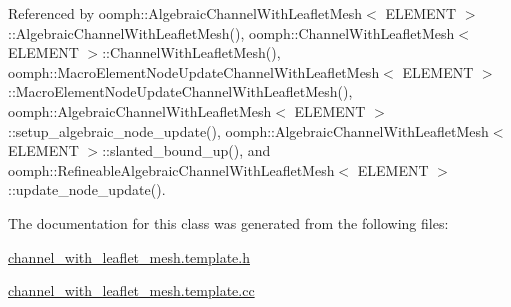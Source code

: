 Referenced by oomph\+::\+Algebraic\+Channel\+With\+Leaflet\+Mesh$<$ E\+L\+E\+M\+E\+N\+T $>$\+::\+Algebraic\+Channel\+With\+Leaflet\+Mesh(), oomph\+::\+Channel\+With\+Leaflet\+Mesh$<$ E\+L\+E\+M\+E\+N\+T $>$\+::\+Channel\+With\+Leaflet\+Mesh(), oomph\+::\+Macro\+Element\+Node\+Update\+Channel\+With\+Leaflet\+Mesh$<$ E\+L\+E\+M\+E\+N\+T $>$\+::\+Macro\+Element\+Node\+Update\+Channel\+With\+Leaflet\+Mesh(), oomph\+::\+Algebraic\+Channel\+With\+Leaflet\+Mesh$<$ E\+L\+E\+M\+E\+N\+T $>$\+::setup\+\_\+algebraic\+\_\+node\+\_\+update(), oomph\+::\+Algebraic\+Channel\+With\+Leaflet\+Mesh$<$ E\+L\+E\+M\+E\+N\+T $>$\+::slanted\+\_\+bound\+\_\+up(), and oomph\+::\+Refineable\+Algebraic\+Channel\+With\+Leaflet\+Mesh$<$ E\+L\+E\+M\+E\+N\+T $>$\+::update\+\_\+node\+\_\+update().



The documentation for this class was generated from the following files\+:\begin{DoxyCompactItemize}
\item 
\hyperlink{channel__with__leaflet__mesh_8template_8h}{channel\+\_\+with\+\_\+leaflet\+\_\+mesh.\+template.\+h}\item 
\hyperlink{channel__with__leaflet__mesh_8template_8cc}{channel\+\_\+with\+\_\+leaflet\+\_\+mesh.\+template.\+cc}\end{DoxyCompactItemize}
